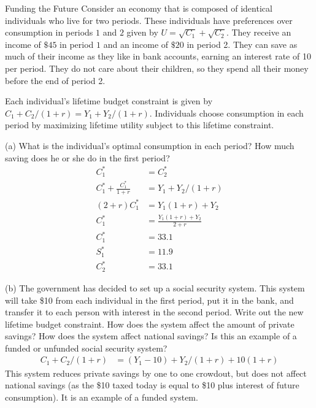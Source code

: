 \documentclass[8pt]{extarticle}
\begin{document}
  \begin{problem}{Funding the Future}
    Consider an economy that is composed of identical individuals who live for two periods. These individuals have preferences over consumption in periods $1$ and $2$ given by $U = \sqrt{C_1} + \sqrt{C_2}$. They receive an income of $\$45$ in period $1$ and an income of $\$20$ in period 2. They can save as much of their income as they like in bank accounts, earning an interest rate of 10 per period. They do not care about their children, so they spend all their money before the end of period 2.\newline

    Each individual's lifetime budget constraint is given by $C_1 + C_2/(1+r) = Y_1 + Y_2/(1+r)$. Individuals choose consumption in each period by maximizing lifetime utility subject to this lifetime constraint.
    \tcblower
    \begin{problem}{(a)}
      What is the individual's optimal consumption in each period? How much saving does he or she do in the first period?
      \tcblower
      \begin{align*}
        C_1^* &= C_2^* \tag*{Consumption Smoothing Equilibrium}\\
        C_1^* + \frac{C_1^*}{1+r} &= Y_1 + Y_2/(1+r)\\
        (2+r)C_1^* &= Y_1(1+r) + Y_2\\
        C_1^* &= \frac{Y_1(1+r) + Y_2}{2+r}\\
        C_1^* &= 33.1\\
        S_1^* &= 11.9\\
        C_2^* &= 33.1
      \end{align*}
    \end{problem}
    \begin{problem}{(b)}
      The government has decided to set up a social security system. This system will take \$10 from each individual in the first period, put it in the bank, and transfer it to each person with interest in the second period. Write out the new lifetime budget constraint. How does the system affect the amount of private savings? How does the system affect national savings? Is this an example of a funded or unfunded social security system?
      \tcblower
      \begin{align*}
        C_1 + C_2/(1+r) &= \left(Y_1-10\right) + Y_2/(1+r) + 10(1+r)
      \end{align*}
      This system reduces private savings by one to one crowdout, but does not affect national savings (as the \$10 taxed today is equal to \$10 plus interest of future consumption). It is an example of a funded system.

\end{problem}
\end{problem}
\end{document}

